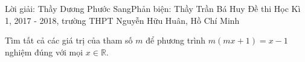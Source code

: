 \begin{name}
{Lời giải: Thầy Dương Phước Sang\newline Phản biện: Thầy Trần Bá Huy}
{Đề thi Học Kì 1, 2017 - 2018, trường THPT Nguyễn Hữu Huân, Hồ Chí Minh}
\end{name}

\setcounter{bt}{0}

\begin{bt}%
	Tìm tất cả các giá trị của tham số $m$ để phương trình $m(mx+1)=x-1$ nghiệm đúng với mọi $x\in \mathbb{R}$.
\end{bt} 

